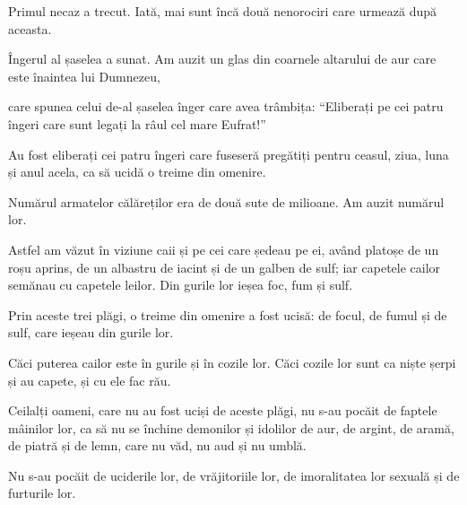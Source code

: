 {\par }{\PP {}Primul necaz a trecut. Iată, mai sunt încă două nenorociri care urmează după aceasta.


\par }{\PP {}Îngerul al șaselea a sunat. Am auzit un glas din coarnele altarului de aur care este înaintea lui Dumnezeu,

care spunea celui de-al șaselea înger care avea trâmbița: “Eliberați pe cei patru îngeri care sunt legați la râul cel mare Eufrat!”


\par }{\PP {}Au fost eliberați cei patru îngeri care fuseseră pregătiți pentru ceasul, ziua, luna și anul acela, ca să ucidă o treime din omenire.

Numărul armatelor călăreților era de două sute de milioane. Am auzit numărul lor.

Astfel am văzut în viziune caii și pe cei care ședeau pe ei, având platoșe de un roșu aprins, de un albastru de iacint și de un galben de sulf; iar capetele cailor semănau cu capetele leilor. Din gurile lor ieșea foc, fum și sulf.

Prin aceste trei plăgi, o treime din omenire a fost ucisă: de focul, de fumul și de sulf, care ieșeau din gurile lor.

Căci puterea cailor este în gurile și în cozile lor. Căci cozile lor sunt ca niște șerpi și au capete, și cu ele fac rău.


\par }{\PP {}Ceilalți oameni, care nu au fost uciși de aceste plăgi, nu s-au pocăit de faptele mâinilor lor, ca să nu se închine demonilor și idolilor de aur, de argint, de aramă, de piatră și de lemn, care nu văd, nu aud și nu umblă.

Nu s-au pocăit de uciderile lor, de vrăjitoriile lor, de imoralitatea lor sexuală și de furturile lor.



\par }

